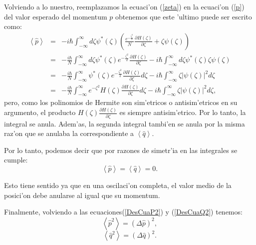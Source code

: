 Volviendo a lo nuestro, reemplazamos la ecuaci'on (\ref{zeta}) en la ecuaci'on (\ref{p}) del
valor esperado del momentum $p$ obtenemos que este 'ultimo puede ser
escrito como:%
\begin{eqnarray}
\left\langle \hat{p}\right> & = &-i\hbar\int_{-\infty}^{\infty}d\zeta
\psi^{\ast}\left( \zeta\right) \left( \frac{e^{-\frac{\zeta^{2}}{2}}}%
{N}\frac{\partial H\left( \zeta\right) }{\partial\zeta}+\zeta\psi\left(
\zeta\right) \right) \\
& = &-\frac{i\hbar}{N}\int_{-\infty}^{\infty}d\zeta\psi^{\ast}\left(
\zeta\right) e^{-\frac{\zeta^{2}}{2}}\frac{\partial H\left( \zeta\right)
}{\partial\zeta}-i\hbar\int_{-\infty}^{\infty}d\zeta\psi^{\ast}\left(
\zeta\right) \zeta\psi\left( \zeta\right) \\
& = &-\frac{i\hbar}{N}\int_{-\infty}^{\infty}\psi^{\ast}\left( \zeta\right)
e^{-\frac{\zeta^{2}}{2}}\frac{\partial H\left( \zeta\right) }{\partial\zeta
}d\zeta-i\hbar\int_{-\infty}^{\infty}\zeta\left| \psi\left( \zeta\right)
\right| ^{2}d\zeta\\
& = &-\frac{i\hbar}{N}\int_{-\infty}^{\infty}e^{-\zeta^{2}}H\left(
\zeta\right) \frac{\partial H\left( \zeta\right) }{\partial\zeta}%
d\zeta-i\hbar\int_{-\infty}^{\infty}\zeta\left| \psi\left( \zeta\right)
\right| ^{2}d\zeta,
\end{eqnarray}
pero, como los polinomios de Hermite son sim'etricos o antisim'etricos en su argumento, el
producto $H\left( \zeta\right) \frac{\partial H\left( \zeta\right)
}{\partial\zeta}$ es siempre antisim'etrico. Por lo tanto, la integral se anula.
Adem'as, la segunda integral tambi'en se anula por la misma raz'on que se
anulaba la correspondiente a $\left\langle \hat{q}\right> .$

Por lo tanto, podemos decir que por razones de simetr'ia en las integrales
se cumple:%
\begin{equation}
\left\langle \hat{p}\right> =\left\langle \hat{q}\right> =0.
\end{equation}


Esto tiene sentido ya que en una oscilaci'on completa, el valor medio de la
posici'on debe anularse al igual que su momentum.

Finalmente, volviendo a las ecuaciones(\ref{DesCuaP2}) y (\ref{DesCuaQ2}) tenemos:%
\begin{equation}
\left\langle \hat{p}^{2}\right> =\left( \Delta\hat{p}\right)
^{2},\label{DesCuaP2b}
\end{equation}
\begin{equation}
\left\langle \hat{q}^{2}\right> =\left( \Delta\hat{q}\right)
^{2}.
\end{equation}


